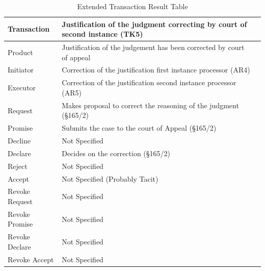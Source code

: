 \begin{landscape}
\begin{table}[h]
\caption{Extended Transaction Result Table}
\label{tab:etrt}
\begin{tabular}{|l||l|l|}
\hline
Transaction  & Justification of the judgment correcting by court of second instance  (TK5) \\ \hline
Product      & Justification of the judgement has been corrected by court of appeal  \\ \hline
Initiator      &  Correction of the justification first instance processor (AR4) \\ \hline
Executor       &  Correction of the justification second instance processor (AR5) \\ \hline
Request        & Makes proposal to correct the reasoning of the judgment (\S165/2)  \\ \hline
Promise        &  Submits the case to the court of Appeal (\S165/2)    \\ \hline
Decline        &  Not Specified   \\ \hline
Declare        & Decides on the correction (\S165/2)  \\ \hline
Reject         &  Not Specified   \\ \hline
Accept         & Not Specified (Probably Tacit) \\ \hline
Revoke Request & Not Specified       \\ \hline
Revoke Promise & Not Specified  \\ \hline
Revoke Declare & Not Specified      \\ \hline
Revoke Accept  &  Not Specified \\ \hline
\end{tabular}
\end{table}


\end{landscape}
